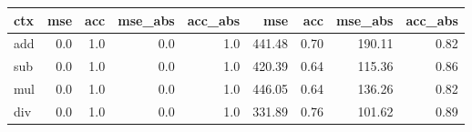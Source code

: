 \begin{tabular}{lrrrrrrrr}
\toprule
ctx &  mse &  acc &  mse\_abs &  acc\_abs &    mse &  acc &  mse\_abs &  acc\_abs \\
\midrule
add &  0.0 &  1.0 &      0.0 &      1.0 & 441.48 & 0.70 &   190.11 &     0.82 \\
sub &  0.0 &  1.0 &      0.0 &      1.0 & 420.39 & 0.64 &   115.36 &     0.86 \\
mul &  0.0 &  1.0 &      0.0 &      1.0 & 446.05 & 0.64 &   136.26 &     0.82 \\
div &  0.0 &  1.0 &      0.0 &      1.0 & 331.89 & 0.76 &   101.62 &     0.89 \\
\bottomrule
\end{tabular}
